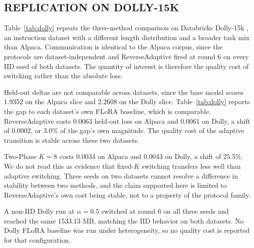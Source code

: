 \subsection{REPLICATION ON DOLLY-15K}
\label{sec:dolly}
Table~\ref{tab:dolly} repeats the three-method comparison on Databricks Dolly-15k \cite{dolly2023}, an instruction dataset with a different length distribution and a broader task mix than Alpaca. Communication is identical to the Alpaca corpus, since the protocols are dataset-independent and ReverseAdaptive fired at round 6 on every IID seed of both datasets. The quantity of interest is therefore the quality cost of switching rather than the absolute loss.

Held-out deltas are not comparable across datasets, since the base model scores 1.9352 on the Alpaca slice and 2.2608 on the Dolly slice. Table~\ref{tab:dolly} reports the gap to each dataset's own FLoRA baseline, which is comparable. ReverseAdaptive costs 0.0063 held-out loss on Alpaca and 0.0061 on Dolly, a shift of 0.0002, or 3.0\% of the gap's own magnitude. The quality cost of the adaptive transition is stable across these two datasets.

Two-Phase $K{=}8$ costs 0.0034 on Alpaca and 0.0043 on Dolly, a shift of 25.5\%. We do not read this as evidence that fixed-$K$ switching transfers less well than adaptive switching. Three seeds on two datasets cannot resolve a difference in stability between two methods, and the claim supported here is limited to ReverseAdaptive's own cost being stable, not to a property of the protocol family.

A non-IID Dolly run at $\alpha{=}0.5$ switched at round 6 on all three seeds and reached the same 1533.13 MB, matching the IID behavior on both datasets. No Dolly FLoRA baseline was run under heterogeneity, so no quality cost is reported for that configuration.

